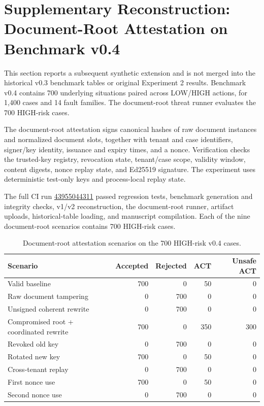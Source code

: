 \documentclass[11pt]{article}
\begin{document}
\section{Supplementary Reconstruction: Document-Root Attestation on Benchmark v0.4}

This section reports a subsequent synthetic extension and is not merged into the historical v0.3 benchmark tables or original Experiment 2 results. Benchmark v0.4 contains 700 underlying situations paired across LOW/HIGH actions, for 1,400 cases and 14 fault families. The document-root threat runner evaluates the 700 HIGH-risk cases.

The document-root attestation signs canonical hashes of raw document instances and normalized document slots, together with tenant and case identifiers, signer/key identity, issuance and expiry times, and a nonce. Verification checks the trusted-key registry, revocation state, tenant/case scope, validity window, content digests, nonce replay state, and Ed25519 signature. The experiment uses deterministic test-only keys and process-local replay state.

The full CI run \href{https://github.com/Hafiz-IIT/EXIM-AI-Evidence-Gated-Autonomy/actions/runs/43955044311}{43955044311} passed regression tests, benchmark generation and integrity checks, v1/v2 reconstruction, the document-root runner, artifact uploads, historical-table loading, and manuscript compilation. Each of the nine document-root scenarios contains 700 HIGH-risk cases.

\begin{table}[ht]
\centering
\small
\begin{tabular}{lrrrr}
\toprule
Scenario & Accepted & Rejected & ACT & Unsafe ACT\\
\midrule
Valid baseline & 700 & 0 & 50 & 0\\
Raw document tampering & 0 & 700 & 0 & 0\\
Unsigned coherent rewrite & 0 & 700 & 0 & 0\\
Compromised root + coordinated rewrite & 700 & 0 & 350 & 300\\
Revoked old key & 0 & 700 & 0 & 0\\
Rotated new key & 700 & 0 & 50 & 0\\
Cross-tenant replay & 0 & 700 & 0 & 0\\
First nonce use & 700 & 0 & 50 & 0\\
Second nonce use & 0 & 700 & 0 & 0\\
\bottomrule
\end{tabular}
\caption{Document-root attestation scenarios on the 700 HIGH-risk v0.4 cases.}
\end{table}
\end{document}
